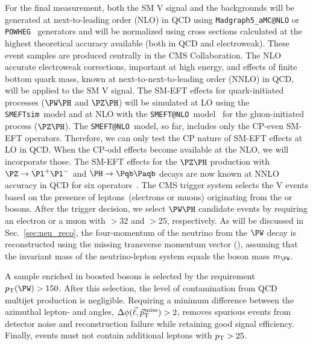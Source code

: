 \documentclass[a4paper,11pt]{article}
\newcommand{\Pb}{{{\Pqb}}\xspace}
\newcommand{\PAb}{{{{\Paqb}}}\xspace}
\renewcommand{\PV}{{{{V}}}\xspace}
\newcommand{\VH}{{{\PV}{\PH}}\xspace}
\begin{document}
For the final measurement, both the SM \VH signal and the backgrounds will be generated at next-to-leading order (NLO) in QCD using \texttt{Madgraph5\_aMC@NLO} or \texttt{POWHEG}~\cite{Nason:2004rx,Powheg_ref,PowhegBox_ref} generators and will be normalized using cross sections calculated at the highest theoretical accuracy available (both in QCD and electroweak). These event samples are produced centrally in the CMS Collaboration.
The NLO accurate electroweak corrections, important at high energy, and effects of finite bottom quark mass, known at next-to-next-to-leading order (NNLO) in QCD, will be applied to the SM \VH signal. 
The SM-EFT effects for quark-initiated processes ($\PW\PH$ and $\PZ\PH$) will be simulated at LO using the \texttt{SMEFTsim}~model and at NLO with the \texttt{SMEFT@NLO}~model~\cite{Degrande:2020evl} for the gluon-initiated process ($\PZ\PH$). 
The \texttt{SMEFT@NLO}~model, so far, includes only the CP-even SM-EFT operators. 
Therefore, we can only test the CP nature of SM-EFT effects at LO in QCD.
When the CP-odd effects become available at the NLO, we will incorporate those.
The SM-EFT effects for the $\PZ\PH$ production with $\PZ \rightarrow  \Pl^{+}\Pl^{-}$ and $\PH \rightarrow \Pb\PAb$ decays are now known at NNLO accuracy in QCD for six operators~\cite{Haisch:2022nwz}. 
The CMS trigger system selects the \VH events based on the presence of leptons~(electrons or muons) originating from the \PW or \PZ bosons.
After the trigger decision, we select $\PW\PH$ candidate events by requiring an electron or a muon with \pt$>32$ and $>25$\GeV, respectively. 
As will be discussed in Sec.~\ref{sec:neu_reco}, the four-momentum of the neutrino from the $\PW$ decay is reconstructed using the missing transverse momentum vector (\ptvecmiss), assuming that the invariant mass of the neutrino-lepton system equals the \PW boson mass $m_{\PW}$.

A sample enriched in boosted \PW bosons is selected by the requirement $\pt(\PW) > 150$\GeV. 
After this selection, the level of contamination from QCD multijet production is negligible.
Requiring a minimum difference between the azimuthal lepton- and \ptmiss angles, $\Delta\phi(\vec{\ell},{\vec p}_{\mathrm{T}}^{\kern1pt\text{miss}})>2$, removes spurious events from detector noise and reconstruction failure while retaining good signal efficiency.
Finally, events must not contain additional leptons with $p_{\mathrm{T}}>25$\GeV.
\end{document}
